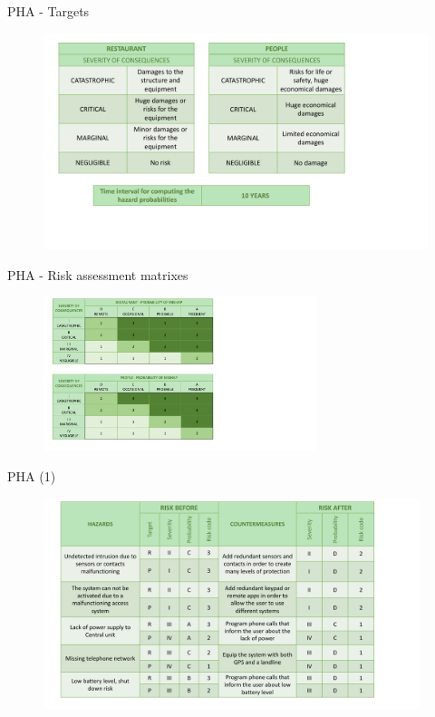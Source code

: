 \begin{frame}{PHA - Targets}
\vskip 0.9cm
    \begin{figure}[ht!]
      \centering
      \includegraphics[width=120mm]{images/targets.pdf}
      \label{fig:targets}
    \end{figure}
\end{frame}

\begin{frame}{PHA - Risk assessment matrixes}

    \begin{figure}[ht!]
      \includegraphics[width=80mm]{images/risk_assessment_matrix.pdf}
      \label{fig:risk_assessment_matrix}
    \end{figure}
\end{frame}

\begin{frame}{PHA (1)}
  \vskip 0.7cm
    \begin{figure}[ht!]
      \centering
      \includegraphics[width=110mm]{images/pha1.pdf}
      \label{fig:pha1}
    \end{figure}
\end{frame}

